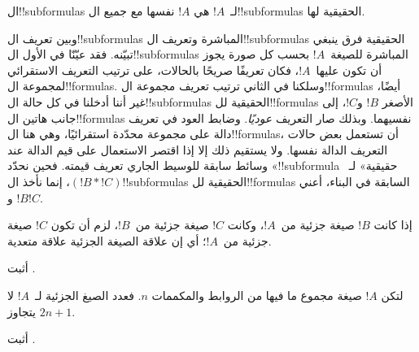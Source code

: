 \documentclass[../../../include/open-logic-section]{subfiles}
\begin{document}
\begin{defn}[!!^{subformula}]
ال!!{subformula}s لـ~$!A$ هي $!A$ نفسها مع جميع ال!!{subformula}s
الحقيقية لها.
\end{defn}

\begin{explain}
وبين تعريف ال!!{subformula}s المباشرة وتعريف ال!!{subformula}s
الحقيقية فرق ينبغي تبيّنه. فقد عيّنّا في الأول ال!!{subformula}s
المباشرة للصيغة~$!A$ بحسب كل صورة يجوز أن تكون عليها~$!A$، فكان
تعريفًا صريحًا بالحالات، على ترتيب التعريف الاستقرائي لمجموعة
ال!!{formula}s. وسلكنا في الثاني ترتيب تعريف مجموعة
ال!!{formula}s أيضًا، غير أننا أدخلنا في كل حالة ال!!{subformula}s
الحقيقية لل!!{formula}s الأصغر $!B$ و$!C$، إلى جانب هاتين
ال!!{formula}s نفسيهما. وبذلك صار التعريف \emph{عوديًا}.
وضابط العود في تعريف دالة على مجموعة محدّدة استقرائيًا، وهي هنا
ال!!{formula}s، أن تستعمل بعض حالات التعريف الدالة نفسها.
ولا يستقيم ذلك إلا إذا اقتصر الاستعمال على قيم الدالة عند وسائط
سابقة للوسيط الجاري تعريف قيمته. فحين نحدّد «!!{subformula} حقيقية»
لـ~$(!B \ast !C)$، إنما نأخذ ال!!{subformula}s الحقيقية
لل!!{formula}s السابقة في البناء، أعني $!B$ و$!C$.
\end{explain}

\begin{prop}
إذا كانت $!B$ صيغة جزئية من~$!A$، وكانت $!C$ صيغة جزئية من~$!B$،
لزم أن تكون $!C$ صيغة جزئية من~$!A$؛ أي إن علاقة الصيغة
الجزئية علاقة متعدية.
\end{prop}

\begin{prob}
أثبت .
\end{prob}

\begin{prop}
لتكن $!A$ صيغة مجموع ما فيها من الروابط والمكممات $n$.
فعدد الصيغ الجزئية لـ~$!A$ لا يتجاوز $2n+1$.
\end{prop}

\begin{prob}
أثبت .
\end{prob}
\end{document}
